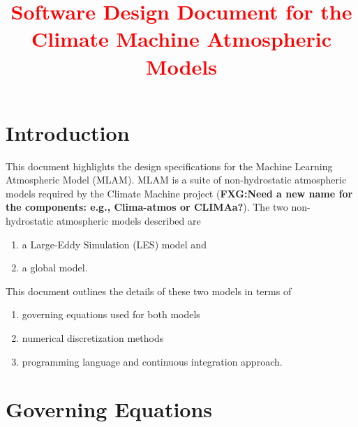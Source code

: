 \documentclass[12pt]{article}
\begin{document}
\title{ \textcolor{red}{Software Design Document for the Climate Machine Atmospheric Models} }
\author{ }

\maketitle
\tableofcontents




\section{Introduction}
\label{sec:introduction}

This document highlights the design specifications for the Machine Learning Atmospheric Model (MLAM). MLAM is a suite of non-hydrostatic atmospheric models required by the Climate Machine  project (\textbf{FXG:Need a new name for the components: e.g., Clima-atmos or CLIMAa?}).  The two non-hydrostatic atmospheric models described are 
\begin{enumerate}
\item a Large-Eddy Simulation (LES) model and 
\item a global model.
\end{enumerate}
This document outlines the details of these two models in terms of 
\begin{enumerate}
\item governing equations  used for both models
\item numerical discretization methods
\item programming language and continuous integration approach.
\end{enumerate}


\section{Governing Equations}
\label{sec:governing_equations}
\end{document}
